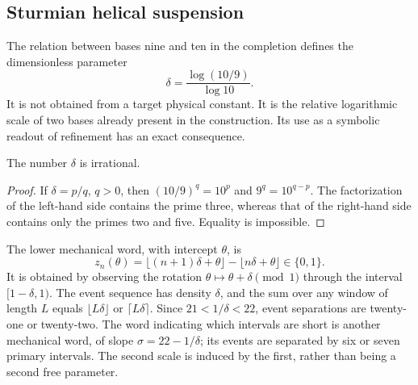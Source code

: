 \subsection{Sturmian helical suspension}

The relation between bases nine and ten in the completion defines the dimensionless parameter
\begin{equation}
 \delta=\frac{\log(10/9)}{\log10}.
 \label{eq:delta-sturm}
\end{equation}
It is not obtained from a target physical constant. It is the relative logarithmic scale of two bases already present in the construction. Its use as a symbolic readout of refinement has an exact consequence.

\begin{lemma}
The number \(\delta\) is irrational.
\end{lemma}
\begin{proof}
If \(\delta=p/q\), \(q>0\), then \((10/9)^q=10^p\) and \(9^q=10^{q-p}\). The factorization of the left-hand side contains the prime three, whereas that of the right-hand side contains only the primes two and five. Equality is impossible.
\end{proof}

The lower mechanical word, with intercept \(\theta\), is
\[
 z_n(\theta)=\lfloor(n+1)\delta+\theta\rfloor-\lfloor n\delta+\theta\rfloor\in\{0,1\}.
\]
It is obtained by observing the rotation \(\theta\mapsto\theta+\delta\pmod1\) through the interval \([1-\delta,1)\). The event sequence has density \(\delta\), and the sum over any window of length \(L\) equals \(\lfloor L\delta\rfloor\) or \(\lceil L\delta\rceil\). Since \(21<1/\delta<22\), event separations are twenty-one or twenty-two. The word indicating which intervals are short is another mechanical word, of slope \(\sigma=22-1/\delta\); its events are separated by six or seven primary intervals. The second scale is induced by the first, rather than being a second free parameter.



